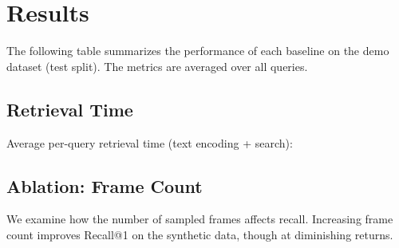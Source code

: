 \section{Results}
\label{sec:results}

The following table summarizes the performance of each baseline on the demo dataset (test split). The metrics are averaged over all queries.



\subsection{Retrieval Time}
Average per-query retrieval time (text encoding + search):



\subsection{Ablation: Frame Count}
We examine how the number of sampled frames affects recall. Increasing frame count improves Recall@1 on the synthetic data, though at diminishing returns.



